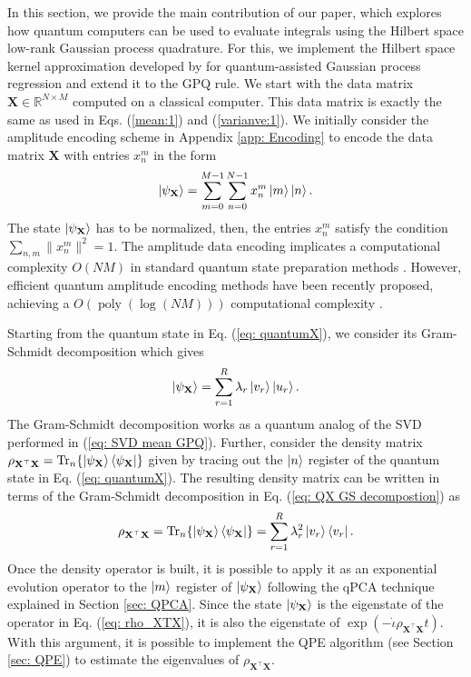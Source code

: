 \documentclass[10pt]{article}
\begin{document}
	In this section, we provide the main contribution of our paper, which explores how quantum computers can be used to evaluate integrals using the Hilbert space low-rank Gaussian process quadrature. 
	For this, we implement the Hilbert space kernel approximation developed by \citet{Farooq2024QAHSGPR} for quantum-assisted Gaussian process regression and extend it to the GPQ rule. We start with the data matrix $\mathbf{X} \in \mathbb{R}^{N \times M}$ computed on a classical computer. This data matrix is exactly the same as used in Eqs. (\ref{mean:1}) and (\ref{varianve:1}). We initially consider the amplitude encoding scheme in Appendix \ref{app: Encoding} to encode the data matrix $\mathbf{X}$ with entries $x_{n}^{m}$ in the form
	\begin{equation}
		\ket{\psi_{\mathbf{X}}} = \sum_{m = 0}^{M-1}\sum_{n = 0}^{N-1} x_{n}^{m}\ket{m}\ket{n}.
		\label{eq: quantumX}
	\end{equation}
	The state $\ket{\psi_{\mathbf{X}}}$ has to be normalized, then, the entries $x_{n}^{m}$ satisfy the condition $\sum_{n,m} \|x_{n}^{m} \|^2 = 1$. 
	The amplitude data encoding implicates a computational complexity $O(NM)$ in standard quantum state preparation methods \citep{Schuld2021QML}. However, efficient quantum amplitude encoding methods have been recently proposed, achieving a $O(\operatorname{poly}(\log (NM)))$ computational complexity \citep{Nakaji2022ApproximateAmplitudeEncoding}.
	
	Starting from the quantum state in Eq. (\ref{eq: quantumX}), we consider its Gram-Schmidt decomposition \citep{Schuld2016QLinearRegresion} which gives
	\begin{equation}
		\ket{\psi_{\mathbf{X}}} = \sum_{r = 1}^{R} \lambda_{r} \ket{v_r} \ket{u_r}.
		\label{eq: QX GS decompostion}
	\end{equation}
	The Gram-Schmidt decomposition works as a quantum analog of the SVD performed in (\ref{eq: SVD mean GPQ}). Further, consider the density matrix $\rho_{\mathbf{X}^{\top}\mathbf{X}}=\operatorname{Tr}_{n} 
	\{ \ket{\psi_{\mathbf{X}}} \bra{\psi_{\mathbf{X}}}\}$ given by tracing out the $\ket{n}$ register of the quantum state in Eq. (\ref{eq: quantumX}). The resulting density matrix can be written in terms of the Gram-Schmidt decomposition in Eq. (\ref{eq: QX GS decompostion}) as 
	\begin{equation}
		\rho_{\mathbf{X}^{\top}\mathbf{X}}=\operatorname{Tr}_{n} \{ \ket{\psi_{\mathbf{X}}} \bra{\psi_{\mathbf{X}}}\} = \sum_{r = 1}^{R} \lambda_r^2 \ket{v_r}\bra{v_r}.
		\label{eq: rho_XTX}
	\end{equation}
	Once the density operator is built, it is possible to apply it as an exponential evolution operator to the $\ket{m}$ register of $\ket{\psi_{\mathbf{X}}}$ following the qPCA technique \citep{Lloyd2014QPCA} explained in Section \ref{sec: QPCA}. Since the state $\ket{\psi_{\mathbf{X}}}$ is the eigenstate of the operator in Eq. (\ref{eq: rho_XTX}), it is also the eigenstate of $\exp({-\dot{\iota} \rho_{\mathbf{X}^{\top}\mathbf{X}} t})$. With this argument, it is possible to implement the QPE algorithm (see Section \ref{sec: QPE}) to estimate the eigenvalues of $\rho_{\mathbf{X}^{\top}\mathbf{X}}$.
	
\end{document}
